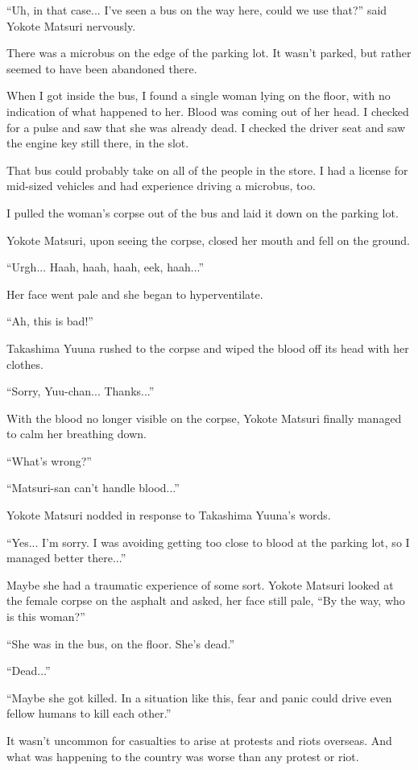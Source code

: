 ``Uh, in that case... I've seen a bus on the way here, could we use that?'' said Yokote Matsuri nervously.

There was a microbus on the edge of the parking lot. It wasn't parked, but rather seemed to have been abandoned there.

When I got inside the bus, I found a single woman lying on the floor, with no indication of what happened to her. Blood was coming out of her head. I checked for a pulse and saw that she was already dead. I checked the driver seat and saw the engine key still there, in the slot.

That bus could probably take on all of the people in the store. I had a license for mid-sized vehicles and had experience driving a microbus, too.

I pulled the woman's corpse out of the bus and laid it down on the parking lot.

Yokote Matsuri, upon seeing the corpse, closed her mouth and fell on the ground.

``Urgh... Haah, haah, haah, eek, haah...''

Her face went pale and she began to hyperventilate.

``Ah, this is bad!''

Takashima Yuuna rushed to the corpse and wiped the blood off its head with her clothes.

``Sorry, Yuu-chan... Thanks...''

With the blood no longer visible on the corpse, Yokote Matsuri finally managed to calm her breathing down.

``What's wrong?''

``Matsuri-san can't handle blood...''

Yokote Matsuri nodded in response to Takashima Yuuna's words.

``Yes... I'm sorry. I was avoiding getting too close to blood at the parking lot, so I managed better there...''

Maybe she had a traumatic experience of some sort. Yokote Matsuri looked at the female corpse on the asphalt and asked, her face still pale, ``By the way, who is this woman?''

``She was in the bus, on the floor. She's dead.''

``Dead...''

``Maybe she got killed. In a situation like this, fear and panic could drive even fellow humans to kill each other.''

It wasn't uncommon for casualties to arise at protests and riots overseas. And what was happening to the country was worse than any protest or riot.

